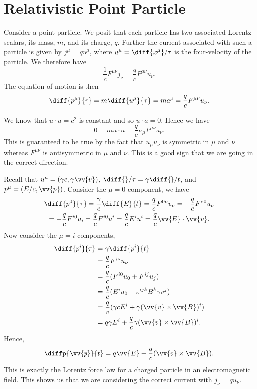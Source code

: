 \section{Relativistic Point Particle}
Consider a point particle.
We posit that each particle has two associated Lorentz scalars, its mass, \(m\), and its charge, \(q\).
Further the current associated with such a particle is given by \(j^\mu = qu^\mu\), where \(u^\mu = \diff{x^\mu}/{\tau}\) is the four-velocity of the particle.
We therefore have
\begin{equation}
    \frac{1}{c}F^{\mu\nu}j_\nu = \frac{q}{c}F^{\mu\nu}u_\nu.
\end{equation}
The equation of motion is then
\begin{equation}
    \diff{p^\mu}{\tau} = m\diff{u^\mu}{\tau} = m a^\mu = \frac{q}{c}F^{\mu\nu}u_\nu.
\end{equation}

We know that \(u \cdot u = c^2\) is constant and so \(u \cdot a = 0\).
Hence we have
\begin{equation}
    0 = m u\cdot a = \frac{q}{c}u_\mu F^{\mu\nu}u_\nu.
\end{equation}
This is guaranteed to be true by the fact that \(u_\mu u_\nu\) is symmetric in \(\mu\) and \(\nu\) whereas \(F^{\mu\nu}\) is antisymmetric in \(\mu\) and \(\nu\).
This is a good sign that we are going in the correct direction.

Recall that \(u^\mu = (\gamma c, \gamma\vv{v})\), \(\diff{}/{\tau} = \gamma\diff{}/{t}\), and \(p^\mu = (E/c, \vv{p})\).
Consider the \(\mu = 0\) component, we have
\begin{multline}
    \diff{p^0}{\tau} = \frac{\gamma}{c} \diff{E}{t} = \frac{q}{c}F^{0\nu}u_\nu = -\frac{q}{c}F^{\nu0}u_\nu\\
    = -\frac{q}{c}F^{i0}u_i = \frac{q}{c}F^{i0}u^i = \frac{q}{c}E^iu^i = \frac{q}{c}\vv{E}\cdot\vv{v}.
\end{multline}
Now consider the \(\mu = i\) components,
\begin{align}
    \diff{p^i}{\tau} &= \gamma\diff{p^i}{t}\\
    &= \frac{q}{c}F^{i\nu}u_\nu\\
    &= \frac{q}{c}(F^{i0}u_0 + F^{ij}u_j)\\
    &= \frac{q}{c}(E^iu_0 + \varepsilon^{ijk}B^k\gamma v^j)\\
    &= \frac{q}{v}(\gamma cE^i + \gamma(\vv{v}\times\vv{B})^i)\\
    &= q\gamma E^i + \frac{q}{c}\gamma(\vv{v}\times \vv{B})^i.
\end{align}
Hence,
\begin{equation}
    \diffp{\vv{p}}{t} = q\vv{E} + \frac{q}{c}(\vv{v} \times \vv{B}).
\end{equation}
This is exactly the Lorentz force law for a charged particle in an electromagnetic field.
This shows us that we are considering the correct current with \(j_\nu = qu_\nu\).